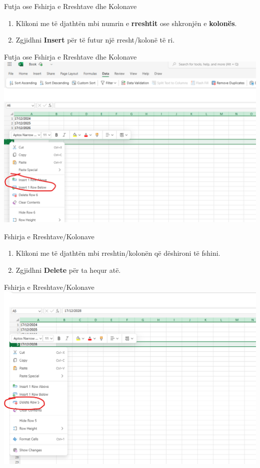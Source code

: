 \documentclass[
  ignorenonframetext,
]{beamer}
\begin{document}
\begin{frame}{Futja ose Fshirja e Rreshtave dhe Kolonave}
\label{futja-ose-fshirja-e-rreshtave-dhe-kolonave}
\begin{enumerate}
\item
  Klikoni me të djathtën mbi numrin e \textbf{rreshtit} ose shkronjën e
  \textbf{kolonës}.
\item
  Zgjidhni \textbf{Insert} për të futur një rresht/kolonë të ri.
\end{enumerate}
\end{frame}

\begin{frame}{Futja ose Fshirja e Rreshtave dhe Kolonave}
\label{futja-ose-fshirja-e-rreshtave-dhe-kolonave-1}
\includegraphics{./images/excel4.png}
\end{frame}

\begin{frame}{Fshirja e Rreshtave/Kolonave}
\label{fshirja-e-rreshtavekolonave}
\begin{enumerate}
\item
  Klikoni me të djathtën mbi rreshtin/kolonën që dëshironi të fshini.
\item
  Zgjidhni \textbf{Delete} për ta hequr atë.
\end{enumerate}
\end{frame}

\begin{frame}{Fshirja e Rreshtave/Kolonave}
\label{fshirja-e-rreshtavekolonave-1}
\includegraphics{./images/excel5.png}
\end{frame}
\end{document}
